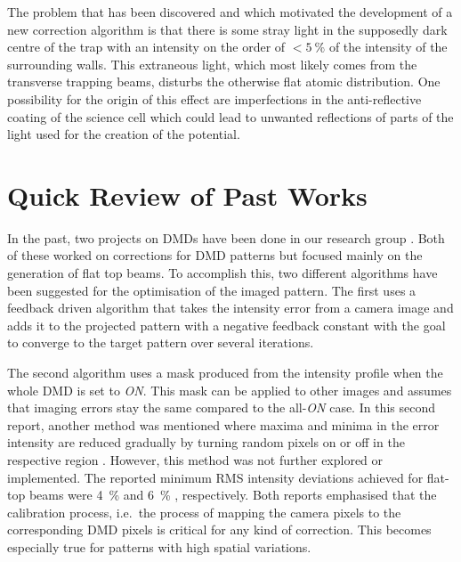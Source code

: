 The problem that has been discovered and which motivated the development of a new correction algorithm is that there is some stray light in the supposedly dark centre of the trap with an intensity on the order of $<\!\SI{5}{\percent}$ of the intensity of the surrounding walls. This extraneous light, which most likely comes from the transverse trapping beams, disturbs the otherwise flat atomic distribution. One possibility for the origin of this effect are imperfections in the anti-reflective coating of the science cell which could lead to unwanted reflections of parts of the light used for the creation of the potential.

\section[Past Works]{Quick Review of Past Works}
\label{sec:pastworks}
In the past, two projects on DMDs have been done in our research group \cite{krstajic,bartlett}. Both of these worked on corrections for DMD patterns but focused mainly on the generation of flat top beams. To accomplish this, two different algorithms have been suggested for the optimisation of the imaged pattern. The first uses a feedback driven algorithm that takes the intensity error from a camera image and adds it to the projected pattern with a negative feedback constant with the goal to converge to the target pattern over several iterations.

The second algorithm uses a mask produced from the intensity profile when the whole DMD is set to \emph{ON}. This mask can be applied to other images and assumes that imaging errors stay the same compared to the all-\emph{ON} case. In this second report, another method was mentioned where maxima and minima in the error intensity are reduced gradually by turning random pixels on or off in the respective region \cite{liang:2010}. However, this method was not further explored or implemented. 
The reported minimum RMS intensity deviations achieved for flat-top beams were \SI{4}{\percent} \cite{krstajic} and \SI{6}{\percent} \cite{bartlett}, respectively.
Both reports emphasised that the calibration process, i.e.\ the process of mapping the camera pixels to the corresponding DMD pixels is critical for any kind of correction. This becomes especially true for patterns with high spatial variations.

